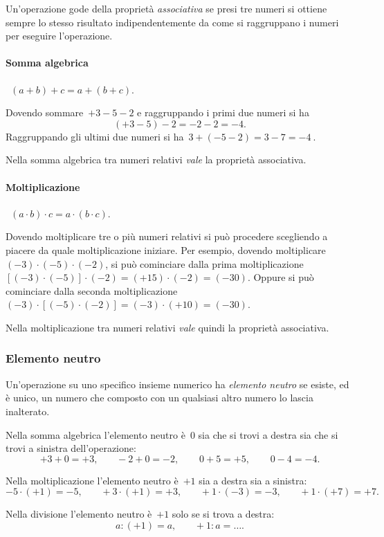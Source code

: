 Un'operazione gode della proprietà \emph{associativa} se presi tre numeri si ottiene sempre
lo stesso risultato indipendentemente da come si raggruppano i numeri per eseguire l'operazione.

\paragraph{Somma algebrica}~$(a + b)+c = a+(b+c)$.

Dovendo sommare~$+3-5-2$ e raggruppando i primi due numeri si ha
\[(+3-5)-2=-2-2=-4.\]
Raggruppando gli ultimi due numeri si ha~$3+(-5-2)=3-7 =-4~$.

Nella somma algebrica tra numeri relativi \emph{vale} la proprietà associativa.

\paragraph{Moltiplicazione}~$(a \cdot b)\cdot c = a\cdot (b\cdot c)$.

Dovendo moltiplicare tre o più numeri relativi si può procedere scegliendo a piacere da quale moltiplicazione iniziare. Per esempio,
dovendo moltiplicare~$(-3)\cdot (-5)\cdot (-2)$,
si può cominciare dalla prima moltiplicazione~$[(-3)\cdot (-5)]\cdot (-2)=(+15)\cdot (-2)=(-30)$.
Oppure si può cominciare dalla seconda moltiplicazione~$(-3)\cdot [(-5)\cdot (-2)]=(-3)\cdot (+10)=(-30)$.

Nella moltiplicazione tra numeri relativi \emph{vale} quindi la proprietà associativa.

\subsubsection{Elemento neutro}

Un'operazione su uno specifico insieme numerico ha \emph{elemento neutro} se esiste, ed è unico, un numero che composto
con un qualsiasi altro numero lo lascia inalterato.

Nella somma algebrica l'elemento neutro è~0 sia che si trovi a destra sia che si trovi a sinistra dell'operazione:
\[+3+0=+3\text{,}\qquad -2+0=-2\text{,}\qquad~0+5=+5\text{,}\qquad~0-4=-4. \]	
		
Nella moltiplicazione l'elemento neutro è~$+1$ sia a destra sia a sinistra:
\[-5\cdot (+1) =-5\text{,}\qquad +3\cdot (+1) = +3\text{,}\qquad +1\cdot (-3) = -3\text{,}\qquad +1\cdot (+7) = +7.\]
		
Nella divisione l'elemento neutro è~$+1$ solo se si trova a destra:
\[a:(+1)=a\text{,}\qquad +1:a =\ldots. \]


